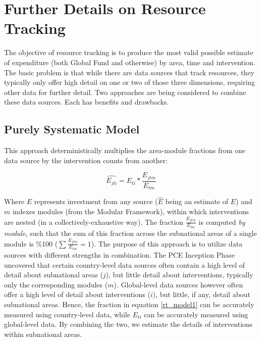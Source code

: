 \documentclass[twocolumn]{bmcart}%
\begin{document}
\section{Further Details on Resource Tracking} \label{resource_tracking}

The objective of resource tracking is to produce the most valid possible estimate of expenditure (both Global Fund and otherwise) by area, time and intervention. The basic problem is that while there are data sources that track resources, they typically only offer high detail on one or two of those three dimensions, requiring other data for further detail. Two approaches are being considered to combine these data sources. Each has benefits and drawbacks.

\subsection{Purely Systematic Model}

This approach deterministically multiplies the area-module fractions from one data source by the intervention counts from another:

\begin{equation} \label{rt_model1}
\widehat{E_{jti}}=E_{ti}*\frac{E_{jtm}}{E_{tm}}
\end{equation}

Where $E$ represents investment from any source ($\hat{E}$ being an estimate of $E$) and $m$ indexes modules (from the Modular Framework), within which interventions are nested (in a collectively-exhaustive way). The fraction $\frac{E_{jtm}}{E_{tm}}$ is computed \textit{by module}, such that the sum of this fraction across the subnational areas of a single module is \%100 ($\sum \frac{E_{jtm}}{E_{tm}}=1$). The purpose of this approach is to utilize data sources with different strengths in combination. The PCE Inception Phase uncovered that certain country-level data sources often contain a high level of detail about subnational areas ($j$), but little detail about interventions, typically only the corresponding modules ($m$). Global-level data sources however often offer a high level of detail about interventions ($i$), but little, if any, detail about subnational areas. Hence, the fraction in equation \ref{rt_model1} can be accurately measured using country-level data, while $E_{ti}$ can be accurately measured using global-level data. By combining the two, we estimate the details of interventions within subnational areas.\\
\end{document}
